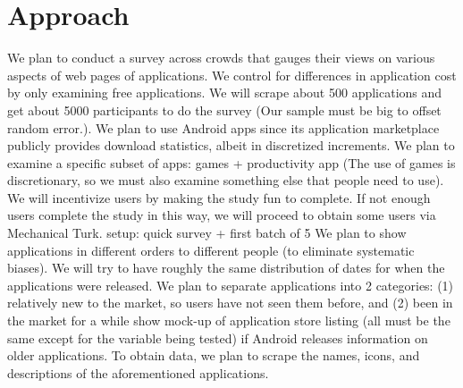 \section{Approach}


We plan to conduct a survey across crowds that gauges their views on various aspects of web pages of applications. We control for differences in application cost by only examining free applications.
We will scrape about 500 applications and get about 5000 participants to do the survey (Our sample must be big to offset random error.).
We plan to use Android apps since its application marketplace publicly provides download statistics, albeit in discretized increments.
We plan to examine a specific subset of apps: games + productivity app (The use of games is discretionary, so we must also examine something else that people need to use). \\

We will incentivize users by making the study fun to complete. If not enough users complete the study in this way, we will proceed to obtain some users via Mechanical Turk.
setup: quick survey + first batch of 5
We plan to show applications in different orders to different people (to eliminate systematic biases).
We will try to have roughly the same distribution of dates for when the applications were released.
We plan to separate applications into 2 categories: (1) relatively new to the market, so users have not seen them before, and (2) been in the market for a while
show mock-up of application store listing (all must be the same except for the variable being tested) if Android releases information on older applications.
To obtain data, we plan to scrape the names, icons, and descriptions of the aforementioned applications.
